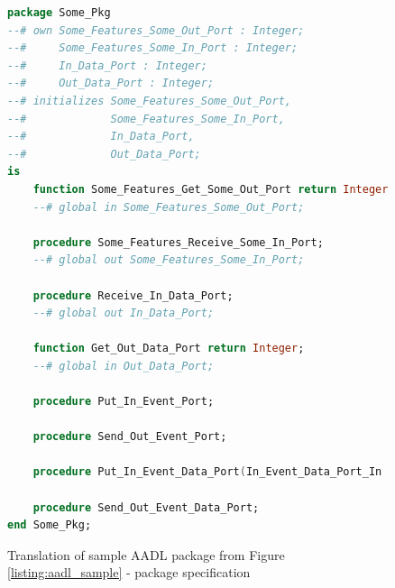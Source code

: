 \begin{figure}[ht]
\singlespacing
\begin{lstlisting}[language=ada, frame=single, gobble=0]
package Some_Pkg
--# own Some_Features_Some_Out_Port : Integer;
--#     Some_Features_Some_In_Port : Integer;
--#     In_Data_Port : Integer;
--#     Out_Data_Port : Integer;
--# initializes Some_Features_Some_Out_Port,
--#             Some_Features_Some_In_Port,
--#             In_Data_Port,
--#             Out_Data_Port;
is
    function Some_Features_Get_Some_Out_Port return Integer;
    --# global in Some_Features_Some_Out_Port;

    procedure Some_Features_Receive_Some_In_Port;
    --# global out Some_Features_Some_In_Port;

    procedure Receive_In_Data_Port;
    --# global out In_Data_Port;

    function Get_Out_Data_Port return Integer;
    --# global in Out_Data_Port;

    procedure Put_In_Event_Port;

    procedure Send_Out_Event_Port;

    procedure Put_In_Event_Data_Port(In_Event_Data_Port_In : Integer);

    procedure Send_Out_Event_Data_Port;
end Some_Pkg;
\end{lstlisting}
\doublespacing
\caption{Translation of sample AADL package from Figure \ref{listing:aadl_sample} - package specification}
\label{listing:package_mapping_spec}
\end{figure}

